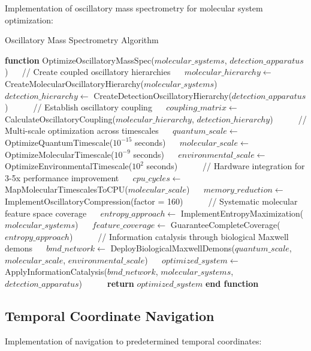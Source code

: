 \documentclass[12pt,a4paper]{article}
\theoremstyle{definition}
\begin{document}
{Implementation of oscillatory mass spectrometry for molecular system optimization:

\begin{algorithm}
\caption{Oscillatory Mass Spectrometry Algorithm}
\begin{algorithmic}[1]
\STATE \textbf{function} OptimizeOscillatoryMassSpec($molecular\_systems$, $detection\_apparatus$)
\STATE $\quad$ // Create coupled oscillatory hierarchies
\STATE $\quad$ $molecular\_hierarchy \leftarrow$ CreateMolecularOscillatoryHierarchy($molecular\_systems$)
\STATE $\quad$ $detection\_hierarchy \leftarrow$ CreateDetectionOscillatoryHierarchy($detection\_apparatus$)
\STATE $\quad$
\STATE $\quad$ // Establish oscillatory coupling
\STATE $\quad$ $coupling\_matrix \leftarrow$ CalculateOscillatoryCoupling($molecular\_hierarchy$, $detection\_hierarchy$)
\STATE $\quad$
\STATE $\quad$ // Multi-scale optimization across timescales
\STATE $\quad$ $quantum\_scale \leftarrow$ OptimizeQuantumTimescale($10^{-15}$ seconds)
\STATE $\quad$ $molecular\_scale \leftarrow$ OptimizeMolecularTimescale($10^{-9}$ seconds)
\STATE $\quad$ $environmental\_scale \leftarrow$ OptimizeEnvironmentalTimescale($10^{2}$ seconds)
\STATE $\quad$
\STATE $\quad$ // Hardware integration for 3-5x performance improvement
\STATE $\quad$ $cpu\_cycles \leftarrow$ MapMolecularTimescalesToCPU($molecular\_scale$)
\STATE $\quad$ $memory\_reduction \leftarrow$ ImplementOscillatoryCompression(factor = 160)
\STATE $\quad$
\STATE $\quad$ // Systematic molecular feature space coverage
\STATE $\quad$ $entropy\_approach \leftarrow$ ImplementEntropyMaximization($molecular\_systems$)
\STATE $\quad$ $feature\_coverage \leftarrow$ GuaranteeCompleteCoverage($entropy\_approach$)
\STATE $\quad$
\STATE $\quad$ // Information catalysis through biological Maxwell demons
\STATE $\quad$ $bmd\_network \leftarrow$ DeployBiologicalMaxwellDemons($quantum\_scale$, $molecular\_scale$, $environmental\_scale$)
\STATE $\quad$ $optimized\_system \leftarrow$ ApplyInformationCatalysis($bmd\_network$, $molecular\_systems$, $detection\_apparatus$)
\STATE $\quad$
\STATE $\quad$ \textbf{return} $optimized\_system$
\STATE \textbf{end function}
\end{algorithmic}
\end{algorithm}

\subsection{Temporal Coordinate Navigation}

Implementation of navigation to predetermined temporal coordinates:

}
\end{document}
